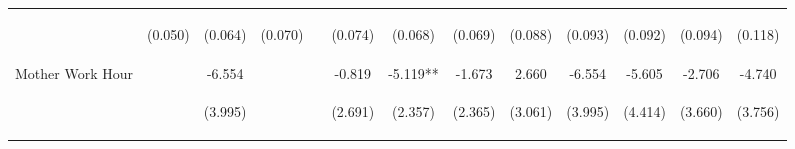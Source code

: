 \begin{tabular}{lcccccccccccc}
 & \begin{footnotesize}(0.050)\end{footnotesize} & \begin{footnotesize}(0.064)\end{footnotesize} & \begin{footnotesize}(0.070)\end{footnotesize} & \begin{footnotesize}\end{footnotesize} & \begin{footnotesize}(0.074)\end{footnotesize} & \begin{footnotesize}(0.068)\end{footnotesize} & \begin{footnotesize}(0.069)\end{footnotesize} & \begin{footnotesize}(0.088)\end{footnotesize} & \begin{footnotesize}(0.093)\end{footnotesize} & \begin{footnotesize}(0.092)\end{footnotesize} & \begin{footnotesize}(0.094)\end{footnotesize} & \begin{footnotesize}(0.118)\end{footnotesize}\\
\noalign{\smallskip}Mother Work Hour &  & -6.554 &  &  & -0.819 & -5.119** & -1.673 & 2.660 & -6.554 & -5.605 & -2.706 & -4.740\\
 & \begin{footnotesize}\end{footnotesize} & \begin{footnotesize}(3.995)\end{footnotesize} & \begin{footnotesize}\end{footnotesize} & \begin{footnotesize}\end{footnotesize} & \begin{footnotesize}(2.691)\end{footnotesize} & \begin{footnotesize}(2.357)\end{footnotesize} & \begin{footnotesize}(2.365)\end{footnotesize} & \begin{footnotesize}(3.061)\end{footnotesize} & \begin{footnotesize}(3.995)\end{footnotesize} & \begin{footnotesize}(4.414)\end{footnotesize} & \begin{footnotesize}(3.660)\end{footnotesize} & \begin{footnotesize}(3.756)\end{footnotesize}\\

\end{tabular}

